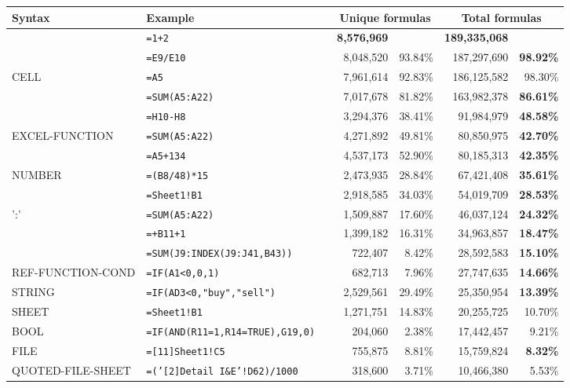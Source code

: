 \begin{tabular}{llrrrrr}
		\hline
		Syntax & Example & &  \multicolumn{2}{c}{Unique formulas} & \multicolumn{2}{c}{Total formulas} \\
		\hline
			\synt{Formula} & \texttt{=1+2} &  & \textbf{8,576,969} & & \textbf{189,335,068} & \\
			\synt{Reference} & \texttt{=E9/E10} &  & 8,048,520 & 93.84\% & 187,297,690 & \textbf{98.92\%}\\
			CELL & \texttt{=A5} &  & 7,961,614 & 92.83\% & 186,125,582 & 98.30\%\\
			\synt{FunctionCall} & \texttt{=SUM(A5:A22)} &  & 7,017,678 & 81.82\% & 163,982,378 & \textbf{86.61\%}\\
			\synt{BinOp} & \texttt{=H10-H8} &  & 3,294,376 & 38.41\% & 91,984,979 & \textbf{48.58\%}\\
			EXCEL-FUNCTION & \texttt{=SUM(A5:A22)} &  & 4,271,892 & 49.81\% & 80,850,975 & \textbf{42.70\%}\\
			\synt{Constant} & \texttt{=A5+134} &  & 4,537,173 & 52.90\% & 80,185,313 & \textbf{42.35\%}\\
			NUMBER & \texttt{=(B8/48)*15} &  & 2,473,935 & 28.84\% & 67,421,408 & \textbf{35.61\%}\\
			\synt{Prefix} & \texttt{=Sheet1!B1} &  & 2,918,585 & 34.03\% & 54,019,709 & \textbf{28.53\%}\\
			\synt{Reference} ':' \synt{Reference} & \texttt{=SUM(A5:A22)} &  & 1,509,887 & 17.60\% & 46,037,124 & \textbf{24.32\%}\\
			\synt{UnOpPrefix} & \texttt{=+B11+1} &  & 1,399,182 & 16.31\% & 34,963,857 & \textbf{18.47\%}\\
			\synt{RefFunctionName} & \texttt{=SUM(J9:INDEX(J9:J41,B43))} &  & 722,407 & 8.42\% & 28,592,583 & \textbf{15.10\%}\\
			REF-FUNCTION-COND & \texttt{=IF(A1<0,0,1)} &  & 682,713 & 7.96\% & 27,747,635 & \textbf{14.66\%}\\
			STRING & \texttt{=IF(AD3<0,"buy","sell")} &  & 2,529,561 & 29.49\% & 25,350,954 & \textbf{13.39\%}\\
			SHEET & \texttt{=Sheet1!B1} &  & 1,271,751 & 14.83\% & 20,255,725 & 10.70\%\\
			BOOL & \texttt{=IF(AND(R11=1,R14=TRUE),G19,0)} &  & 204,060 & 2.38\% & 17,442,457 & 9.21\%\\
			FILE & \texttt{=[11]Sheet1!C5} &  & 755,875 & 8.81\% & 15,759,824 & \textbf{8.32\%}\\
			QUOTED-FILE-SHEET & \texttt{=('[2]Detail I\&E'!D62)/1000} &  & 318,600 & 3.71\% & 10,466,380 & 5.53\%\\

\end{tabular}
